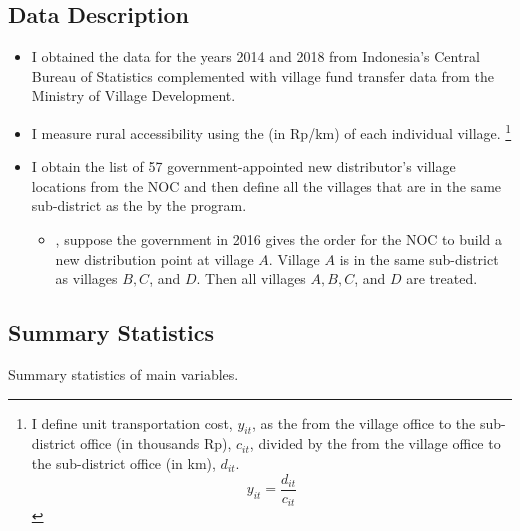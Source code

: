 \documentclass[
11pt,notheorems,compress,hyperref={pdfauthor=Maghfira Ramadhani}
]{beamer}
\begin{document}
\subsection{Data Description}
\begin{frame}
    \begin{itemize}
        \item I obtained the  data for the years 2014 and 2018 from Indonesia's Central Bureau of Statistics complemented with village fund transfer data from the Ministry of Village Development.
        \item I measure rural accessibility using the  (in Rp/km) of each individual village. 
        \footnote{I define unit transportation cost, $y_{it}$, as the  from the village office to the sub-district office (in thousands Rp), $c_{it}$, divided by the  from the village office to the sub-district office (in km), $d_{it}$.
        \begin{equation}
        y_{it}=\frac{d_{it}}{c_{it}}    
        \end{equation}}
        \item I obtain the list of 57 government-appointed new distributor's village locations from the NOC and then define all the villages that are in the same sub-district as the  by the program. 
        \begin{itemize}
            \item {}, suppose the government in 2016 gives the order for the NOC to build a new distribution point at village $A$. Village $A$ is in the same sub-district as villages $B,C$, and $D$. Then all villages $A,B,C$, and $D$ are treated.
        \end{itemize}
    \end{itemize}
\end{frame}

\subsection{Summary Statistics}
\begin{frame}
    \begin{table}[h]
    \caption{Summary statistics of main variables. }
    \scalebox{0.75}{}
    \label{t1}\end{table}
\end{frame}
\end{document}
